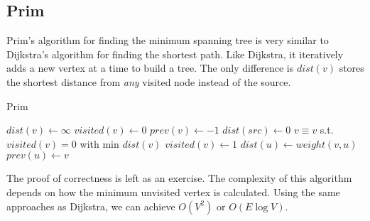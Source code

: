 \subsection{Prim}

Prim's algorithm for finding the minimum spanning tree is very similar to Dijkstra's algorithm for finding the shortest path. Like Dijkstra, it iteratively adds a new vertex at a time to build a tree. The only difference is $dist(v)$ stores the shortest distance from \textit{any} visited node instead of the source.

\begin{algorithm}[H]
\caption{Prim}
\begin{algorithmic}
	\State $dist(v) \gets \infty$
	\State $visited(v) \gets 0$
    \State $prev(v) \gets -1$
\EndFor
\State $dist(src) \gets 0$
	\State $v \equiv v$ s.t. $visited(v)=0$ with min $dist(v)$
    \State $visited(v) \gets 1$
				\State $dist(u) \gets weight(v, u)$
   	        	\State $prev(u) \gets v$
			\EndIf
        \EndIf
    \EndFor
\EndWhile
\end{algorithmic}
\end{algorithm}

The proof of correctness is left as an exercise. The complexity of this algorithm depends on how the minimum unvisited vertex is calculated. Using the same approaches as Dijkstra, we can achieve $O(V^2)$ or $O(E \log{V})$.

